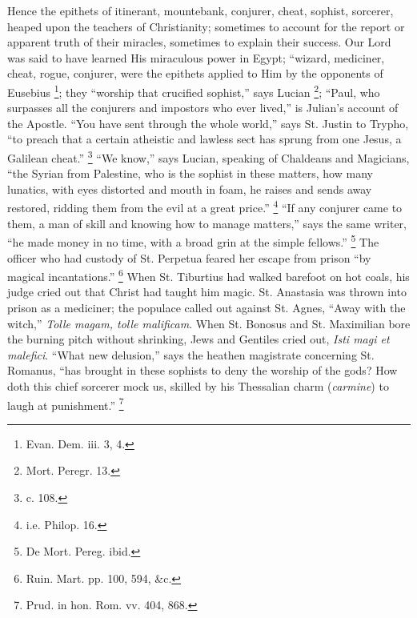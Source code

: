 Hence the epithets of itinerant, mountebank, conjurer,
cheat, sophist, sorcerer, heaped upon the teachers of
Christianity; sometimes to account for the report or
apparent truth of their miracles, sometimes to explain
their success. Our Lord was said to have learned His
miraculous power in Egypt; ``wizard, mediciner,
cheat, rogue, conjurer, were the epithets applied to Him
by the opponents of Eusebius \footnote{Evan. Dem. iii. 3, 4.}; they ``worship that
crucified sophist,'' says Lucian \footnote{Mort. Peregr. 13.}; ``Paul, who surpasses
all the conjurers and impostors who ever lived,'' is
Julian's account of the Apostle. ``You have sent
through the whole world,'' says St. Justin to Trypho,
``to preach that a certain atheistic and lawless sect
has sprung from one Jesus, a Galilean cheat.'' \footnote{c. 108.}
``We know,'' says Lucian, speaking of Chaldeans
and Magicians, ``the Syrian from Palestine, who is
the sophist in these matters, how many lunatics, with
eyes distorted and mouth in foam, he raises and sends
away restored, ridding them from the evil at a great
price.'' \footnote{i.e. Philop. 16.} ``If any conjurer came to them, a man of
skill and knowing how to manage matters,'' says the
same writer, ``he made money in no time, with a broad
grin at the simple fellows.'' \footnote{De Mort. Pereg. ibid.} The officer who had custody
of St. Perpetua feared her escape from prison ``by
magical incantations.'' \footnote{Ruin. Mart. pp. 100, 594,
\&c.} When St. Tiburtius had
walked barefoot on hot coals, his judge cried out that
Christ had taught him magic. St. Anastasia was thrown
into prison as a mediciner; the populace called out
against St. Agnes, ``Away with the witch,'' \emph{Tolle
magam, tolle malificam}. When St. Bonosus and St.
Maximilian bore the burning pitch without shrinking, Jews
and Gentiles cried out, \emph{Isti magi et malefici}.
``What new delusion,'' says the heathen
magistrate concerning St. Romanus, ``has brought in
these sophists to deny the worship of the gods? How doth
this chief sorcerer mock us, skilled by his Thessalian
charm (\emph{carmine}) to laugh at punishment.'' \footnote{Prud. in hon. Rom. vv. 404,
868.}

